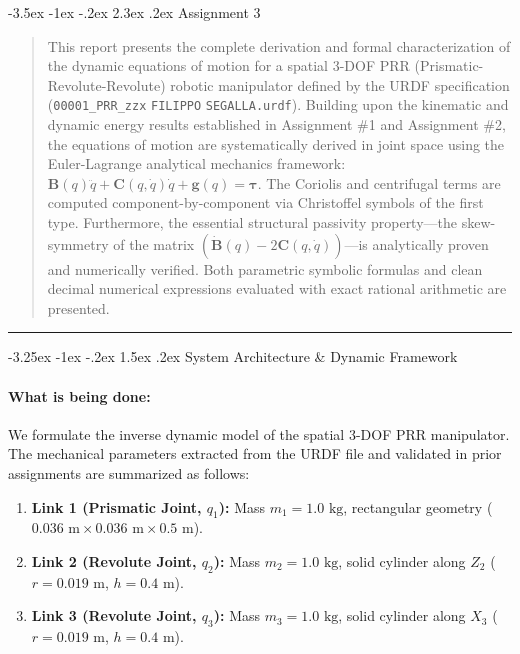 \documentclass[11pt, a4paper]{article}
\makeatletter
\renewcommand{\section}{\@startsection{section}{1}{\z@}%
    {-3.5ex \@plus -1ex \@minus -.2ex}%
    {2.3ex \@plus .2ex}%
    {\normalfont\Large\bfseries\color{brandblue}}}
\renewcommand{\subsection}{\@startsection{subsection}{2}{\z@}%
    {-3.25ex \@plus -1ex \@minus -.2ex}%
    {1.5ex \@plus .2ex}%
    {\normalfont\large\bfseries\color{brandaccent}}}
\makeatother
\begin{document}
\section{Assignment 3}
\label{sec:assignment3}

\begin{abstract}
\noindent
This report presents the complete derivation and formal characterization of the dynamic equations of motion for a spatial 3-DOF PRR (Prismatic-Revolute-Revolute) robotic manipulator defined by the URDF specification (\texttt{00001\_PRR\_zzx} \texttt{FILIPPO} \texttt{SEGALLA.urdf}). Building upon the kinematic and dynamic energy results established in Assignment \#1 and Assignment \#2, the equations of motion are systematically derived in joint space using the Euler-Lagrange analytical mechanics framework: $\mathbf{B}(q)\ddot{q} + \mathbf{C}(q, \dot{q})\dot{q} + \mathbf{g}(q) = \boldsymbol{\tau}$. The Coriolis and centrifugal terms are computed component-by-component via Christoffel symbols of the first type. Furthermore, the essential structural passivity property—the skew-symmetry of the matrix $(\mathbf{\dot{B}}(q) - 2\mathbf{C}(q, \dot{q}))$—is analytically proven and numerically verified. Both parametric symbolic formulas and clean decimal numerical expressions evaluated with exact rational arithmetic are presented.
\end{abstract}

\hrule
\vspace{1.5em}

\subsection{System Architecture \& Dynamic Framework}
\paragraph{What is being done:}
We formulate the inverse dynamic model of the spatial 3-DOF PRR manipulator. The mechanical parameters extracted from the URDF file and validated in prior assignments are summarized as follows:
\begin{enumerate}[leftmargin=1.5em]
    \item \textbf{Link 1 (Prismatic Joint, $q_1$):} Mass $m_1 = 1.0\text{ kg}$, rectangular geometry ($0.036\text{ m} \times 0.036\text{ m} \times 0.5\text{ m}$).
    \item \textbf{Link 2 (Revolute Joint, $q_2$):} Mass $m_2 = 1.0\text{ kg}$, solid cylinder along $Z_2$ ($r = 0.019\text{ m}$, $h = 0.4\text{ m}$).
    \item \textbf{Link 3 (Revolute Joint, $q_3$):} Mass $m_3 = 1.0\text{ kg}$, solid cylinder along $X_3$ ($r = 0.019\text{ m}$, $h = 0.4\text{ m}$).
\end{enumerate}
\end{document}
